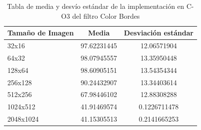 \documentclass[a4paper]{article}
\begin{document}
\begin{table}[h!]
	\begin{center}
		\begin{tabular}{| l | c | c |}
			\hline
			Tamaño de Imagen & Media & Desviación estándar \\ \hline
			32x16	& 97.62231445	& 12.06571904 \\
			64x32	& 98.07945557	& 13.35950448 \\ 
			128x64	& 98.60905151	& 13.54354344 \\
			256x128	& 90.24432907	& 13.34403614 \\
			512x256	& 67.98446102	& 12.88308288 \\
			1024x512 & 41.91469574	& 0.1226711478 \\
			2048x1024 &41.15305513	& 0.2141665253 \\ \hline
		\end{tabular}
		\caption{Tabla de media y desvío estándar de la implementación en C-O3 del filtro Color Bordes}
	\end{center}
\end{table}
\end{document}
